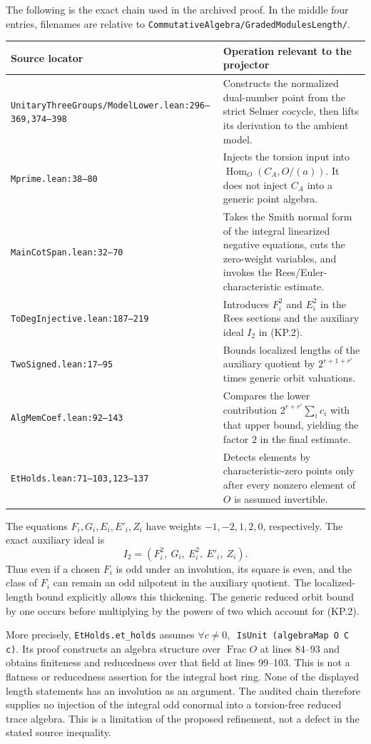 The following is the exact chain used in the archived proof.
In the middle four entries, filenames are relative to
\texttt{CommutativeAlgebra/GradedModulesLength/}.
\begin{center}
\begin{tabular}{p{}p{}}
\textbf{Source locator} & \textbf{Operation relevant to the projector}\\\hline
\texttt{UnitaryThreeGroups/ModelLower.lean:296--369,374--398}
 & Constructs the normalized dual-number point from the strict
 Selmer cocycle, then lifts its derivation to the ambient model.\\
\texttt{Mprime.lean:38--80}
 & Injects the torsion input into
 $\operatorname{Hom}_O(C_A,O/(a))$.  It does not inject $C_A$
 into a generic point algebra.\\
\texttt{MainCotSpan.lean:32--70}
 & Takes the Smith normal form of the integral linearized
 negative equations, cuts the zero-weight variables, and invokes
 the Rees/Euler-characteristic estimate.\\
\texttt{ToDegInjective.lean:187--219}
 & Introduces $F_i^2$ and $E_i^2$ in the Rees sections and the
 auxiliary ideal $I_2$ in (KP.2).\\
\texttt{TwoSigned.lean:17--95}
 & Bounds localized lengths of the auxiliary quotient by
 $2^{r+1+r'}$ times generic orbit valuations.\\
\texttt{AlgMemCoef.lean:92--143}
 & Compares the lower contribution
 $2^{r+r'}\sum_i c_i$ with that upper bound, yielding the factor
 $2$ in the final estimate.\\
\texttt{EtHolds.lean:71--103,123--137}
 & Detects elements by characteristic-zero points only after
 every nonzero element of $O$ is assumed invertible.\\
\end{tabular}
\end{center}
The equations $F_i,G_i,E_i,E'_i,Z_i$ have weights
$-1,-2,1,2,0$, respectively.  The exact auxiliary ideal is
\[
        I_2=(F_i^2,\ G_i,\ E_i^2,\ E'_i,\ Z_i).              \tag{KP.2}
\]
Thus even if a chosen $F_i$ is odd under an involution,
its square is even, and the class of $F_i$ can remain an odd
nilpotent in the auxiliary quotient.  The localized-length
bound explicitly allows this thickening.  The generic reduced
orbit bound by one occurs before multiplying by the powers of
two which account for (KP.2).

More precisely, \texttt{EtHolds.et\_holds} assumes
\texttt{\(\forall c\ne0,\) IsUnit (algebraMap O C c)}.
Its proof constructs an algebra structure over $\operatorname{Frac}O$
at lines 84--93 and obtains finiteness and reducedness over that
field at lines 99--103.  This is not a flatness or reducedness
assertion for the integral host ring.  None of the displayed
length statements has an involution as an argument.  The audited
chain therefore supplies no injection of the integral odd
conormal into a torsion-free reduced trace algebra.  This is a
limitation of the proposed refinement, not a defect in the
stated source inequality.

